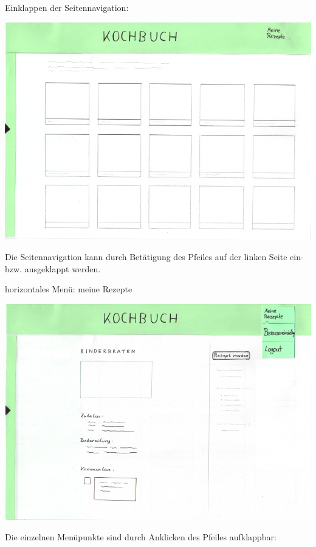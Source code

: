 \documentclass[parskip,10pt,abstracton]{scrartcl}
\begin{document}
Einklappen der Seitennavigation:
\begin{center}
\includegraphics[scale=0.4]{Prototyp/home_menuhidden.png}
\end{center}

Die Seitennavigation kann durch Betätigung des Pfeiles auf der linken Seite ein- bzw. ausgeklappt werden. 

horizontales Menü: meine Rezepte
\begin{center}
\includegraphics[scale=0.4]{Prototyp/menu_eigeneRezepte_menuhidden.png}
\end{center}


Die einzelnen Menüpunkte sind durch Anklicken des Pfeiles aufklappbar:
\end{document}
